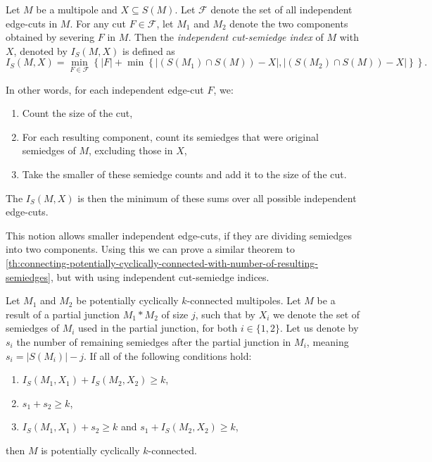 \documentclass[12pt, twoside]{book}
\begin{document}
\begin{definition}
	Let $M$ be a multipole and $X\subseteq S(M)$.  Let $\mathcal{F}$ denote the set of all independent edge-cuts in $M$. For any cut $F\in\mathcal{F}$, let $M_1$ and $M_2$ denote the two components obtained by severing $F$ in $M$. Then the \textit{independent cut-semiedge index} of $M$ with $X$, denoted by $I_S(M, X)$ is defined as
	$$I_S(M, X)=\min\limits_{F\in\mathcal{F}} \left\{|F|+\min\left\{\left|\left(S(M_1)\cap S(M)\right)-X\right|, \left|\left(S(M_2)\cap S(M)\right)-X\right|\right\}\right\}.$$
\end{definition}

In other words, for each independent edge-cut $F$, we:
\begin{enumerate}
	\item Count the size of the cut,
	\item For each resulting component, count its semiedges that were original semiedges of $M$, excluding those in $X$,
	\item Take the smaller of these semiedge counts and add it to the size of the cut.
\end{enumerate}
The $I_S(M, X)$ is then the minimum of these sums over all possible independent edge-cuts.

This notion allows smaller independent edge-cuts, if they are dividing semiedges into two components. Using this we can prove a similar theorem to \cref{th:connecting-potentially-cyclically-connected-with-number-of-resulting-semiedges}, but with using independent cut-semiedge indices.

\begin{theorem}\label{th:potentially-cyclically-connected-independent-semiedge-index}
	Let $M_1$ and $M_2$ be potentially cyclically $k$-connected multipoles. Let $M$ be a result of a partial junction $M_1*M_2$ of size $j$, such that by $X_i$ we denote the set of semiedges of $M_i$ used in the partial junction, for both $i\in \{1,2\}$. Let us denote by $s_i$ the number of remaining semiedges after the partial junction in $M_i$, meaning ${s_i=|S(M_i)|-j}$. If all of the following conditions hold:
	\begin{enumerate}[label=(\roman*)]
		\item $I_S(M_1, X_1)+I_S(M_2, X_2)\geq k$,
		\item $s_1+s_2\geq k$,
		\item $I_S(M_1, X_1)+s_2\geq k$ and $s_1+I_S(M_2, X_2)\geq k$,
	\end{enumerate}
	then $M$ is potentially cyclically $k$-connected.
\end{theorem}
\end{document}
